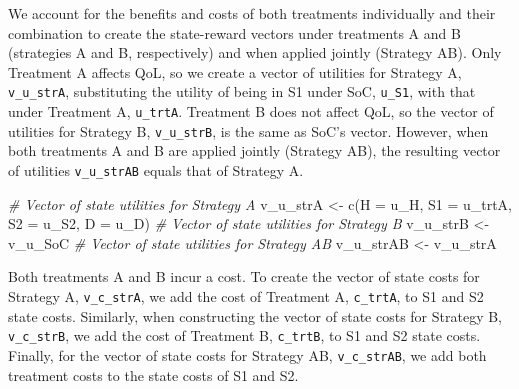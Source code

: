 \documentclass[
]{article}
\newenvironment{Shaded}{\begin{snugshade}}{\end{snugshade}}
\newcommand{\AttributeTok}[1]{\textcolor[rgb]{0.77,0.63,0.00}{#1}}
\newcommand{\CommentTok}[1]{\textcolor[rgb]{0.56,0.35,0.01}{\textit{#1}}}
\newcommand{\FunctionTok}[1]{\textcolor[rgb]{0.00,0.00,0.00}{#1}}
\newcommand{\NormalTok}[1]{#1}
\newcommand{\OtherTok}[1]{\textcolor[rgb]{0.56,0.35,0.01}{#1}}
\begin{document}
We account for the benefits and costs of both treatments individually and their combination to create the state-reward vectors under treatments A and B (strategies A and B, respectively) and when applied jointly (Strategy AB). Only Treatment A affects QoL, so we create a vector of utilities for Strategy A, \texttt{v\_u\_strA}, substituting the utility of being in S1 under SoC, \texttt{u\_S1}, with that under Treatment A, \texttt{u\_trtA}. Treatment B does not affect QoL, so the vector of utilities for Strategy B, \texttt{v\_u\_strB}, is the same as SoC's vector. However, when both treatments A and B are applied jointly (Strategy AB), the resulting vector of utilities \texttt{v\_u\_strAB} equals that of Strategy A.

\begin{Shaded}
\begin{Highlighting}[]
\CommentTok{\# Vector of state utilities for Strategy A}
\NormalTok{v\_u\_strA }\OtherTok{\textless{}{-}} \FunctionTok{c}\NormalTok{(}\AttributeTok{H =}\NormalTok{ u\_H, }\AttributeTok{S1 =}\NormalTok{ u\_trtA, }\AttributeTok{S2 =}\NormalTok{ u\_S2, }\AttributeTok{D =}\NormalTok{ u\_D)}
\CommentTok{\# Vector of state utilities for Strategy B}
\NormalTok{v\_u\_strB }\OtherTok{\textless{}{-}}\NormalTok{ v\_u\_SoC}
\CommentTok{\# Vector of state utilities for Strategy AB}
\NormalTok{v\_u\_strAB }\OtherTok{\textless{}{-}}\NormalTok{ v\_u\_strA}
\end{Highlighting}
\end{Shaded}

Both treatments A and B incur a cost. To create the vector of state costs for Strategy A, \texttt{v\_c\_strA}, we add the cost of Treatment A, \texttt{c\_trtA}, to S1 and S2 state costs. Similarly, when constructing the vector of state costs for Strategy B, \texttt{v\_c\_strB}, we add the cost of Treatment B, \texttt{c\_trtB}, to S1 and S2 state costs. Finally, for the vector of state costs for Strategy AB, \texttt{v\_c\_strAB}, we add both treatment costs to the state costs of S1 and S2.
\end{document}
